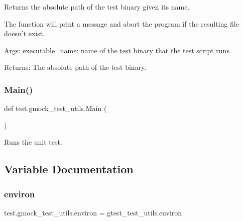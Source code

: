 \begin{DoxyVerb}Returns the absolute path of the test binary given its name.

The function will print a message and abort the program if the resulting file
doesn't exist.

Args:
  executable_name: name of the test binary that the test script runs.

Returns:
  The absolute path of the test binary.
\end{DoxyVerb}
 \mbox{\label{namespacetest_1_1gmock__test__utils_ac34a409a19ef577ba2dc8bf8f5434a28}} 
\subsubsection{\texorpdfstring{Main()}{Main()}}
{\footnotesize\ttfamily def test.\+gmock\+\_\+test\+\_\+utils.\+Main (\begin{DoxyParamCaption}{ }\end{DoxyParamCaption})}

\begin{DoxyVerb}Runs the unit test.\end{DoxyVerb}
 

\subsection{Variable Documentation}
\mbox{\label{namespacetest_1_1gmock__test__utils_a043a2edfb6718610cf223c9e806a2e29}} 
\subsubsection{\texorpdfstring{environ}{environ}}
{\footnotesize\ttfamily test.\+gmock\+\_\+test\+\_\+utils.\+environ = gtest\+\_\+test\+\_\+utils.\+environ}

\mbox{\label{namespacetest_1_1gmock__test__utils_ab9f899d331de99dc5ce7000301189a8d}} 
